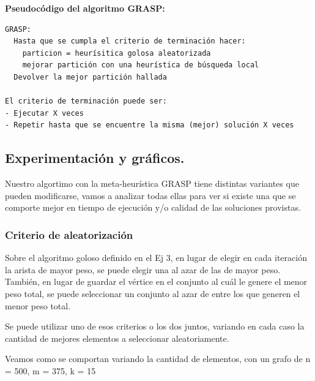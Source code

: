 \vspace*{0.35cm}

\textbf{Pseudocódigo del algoritmo GRASP:}

\vspace*{0.1cm}

\begin{verbatim}
GRASP:
  Hasta que se cumpla el criterio de terminación hacer:
    particion = heurísitica golosa aleatorizada
    mejorar partición con una heurística de búsqueda local
  Devolver la mejor partición hallada

El criterio de terminación puede ser:
- Ejecutar X veces
- Repetir hasta que se encuentre la misma (mejor) solución X veces
\end{verbatim}

\newpage
\subsection{Experimentación y gráficos.}
\vspace*{0.3cm}

Nuestro algortimo con la meta-heurística GRASP tiene distintas variantes que
pueden modificarse, vamos a analizar todas ellas para ver si existe una que
se comporte mejor en tiempo de ejecución y/o calidad de las soluciones
provistas.

\subsubsection{Criterio de aleatorización}

Sobre el algoritmo goloso definido en el Ej 3, en lugar de elegir en cada
iteración la arista de mayor peso, se puede elegir una al azar de las de mayor
peso. También, en lugar de guardar el vértice en el conjunto al cuál le genere
el menor peso total, se puede seleccionar un conjunto al azar de entre los que
generen el menor peso total.

Se puede utilizar uno de esos criterios o los dos juntos, variando en cada
caso la cantidad de mejores elementos a seleccionar aleatoriamente.

Veamos como se comportan variando la cantidad de elementos, con un grafo de
n = 500, m = 375, k = 15
\vspace*{0.5cm}

